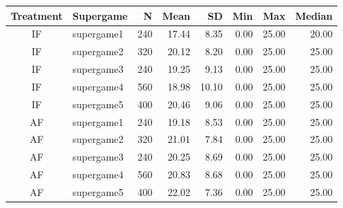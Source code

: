 \begin{tabular}{clrrrrrr}
  \toprule
Treatment & Supergame& N & Mean & SD & Min & Max & Median \\ 
  \midrule
  IF & supergame1 & 240 & 17.44 & 8.35 & 0.00 & 25.00 & 20.00 \\ 
    IF & supergame2 & 320 & 20.12 & 8.20 & 0.00 & 25.00 & 25.00 \\ 
    IF & supergame3 & 240 & 19.25 & 9.13 & 0.00 & 25.00 & 25.00 \\ 
    IF & supergame4 & 560 & 18.98 & 10.10 & 0.00 & 25.00 & 25.00 \\ 
    IF & supergame5 & 400 & 20.46 & 9.06 & 0.00 & 25.00 & 25.00 \\ 
    AF & supergame1 & 240 & 19.18 & 8.53 & 0.00 & 25.00 & 25.00 \\ 
    AF & supergame2 & 320 & 21.01 & 7.84 & 0.00 & 25.00 & 25.00 \\ 
    AF & supergame3 & 240 & 20.25 & 8.69 & 0.00 & 25.00 & 25.00 \\ 
    AF & supergame4 & 560 & 20.83 & 8.68 & 0.00 & 25.00 & 25.00 \\ 
    AF & supergame5 & 400 & 22.02 & 7.36 & 0.00 & 25.00 & 25.00 \\ 
   \bottomrule
\end{tabular}
